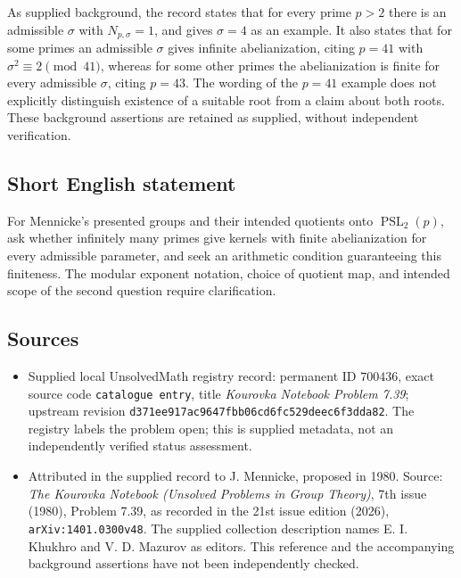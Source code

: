 \documentclass[11pt]{article}
\begin{document}
As supplied background, the record states that for every prime \(p>2\) there is an admissible \(\sigma\) with \(N_{p,\sigma}=1\), and gives \(\sigma=4\) as an example. It also states that for some primes an admissible \(\sigma\) gives infinite abelianization, citing \(p=41\) with \(\sigma^2\equiv2\pmod{41}\), whereas for some other primes the abelianization is finite for every admissible \(\sigma\), citing \(p=43\). The wording of the \(p=41\) example does not explicitly distinguish existence of a suitable root from a claim about both roots. These background assertions are retained as supplied, without independent verification.
\subsection{Short English statement}
For Mennicke's presented groups and their intended quotients onto \(\operatorname{PSL}_2(p)\), ask whether infinitely many primes give kernels with finite abelianization for every admissible parameter, and seek an arithmetic condition guaranteeing this finiteness. The modular exponent notation, choice of quotient map, and intended scope of the second question require clarification.
\subsection{Sources}
\begin{itemize}
\item Supplied local UnsolvedMath registry record: permanent ID \(700436\), exact source code \texttt{catalogue entry}, title \emph{Kourovka Notebook Problem 7.39}; upstream revision \texttt{d371ee917ac9647fbb06cd6fc529deec6f3dda82}. The registry labels the problem open; this is supplied metadata, not an independently verified status assessment.
\item Attributed in the supplied record to J. Mennicke, proposed in 1980. Source: \emph{The Kourovka Notebook (Unsolved Problems in Group Theory)}, 7th issue (1980), Problem 7.39, as recorded in the 21st issue edition (2026), \texttt{arXiv:1401.0300v48}. The supplied collection description names E. I. Khukhro and V. D. Mazurov as editors. This reference and the accompanying background assertions have not been independently checked.
\end{itemize}
\end{document}

